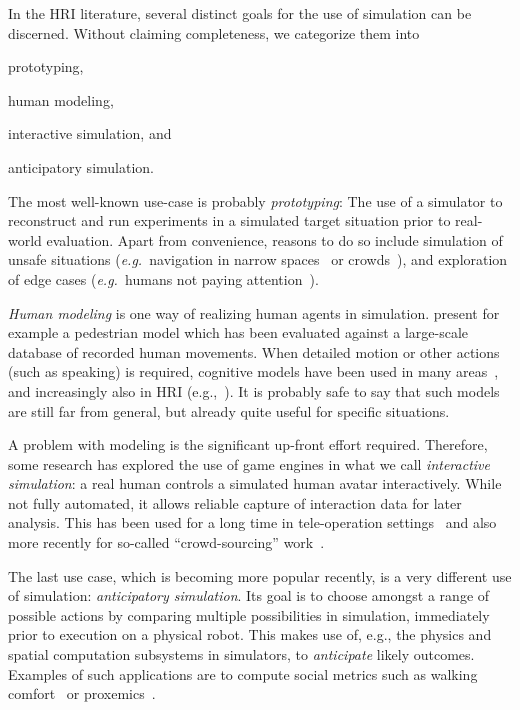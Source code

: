 \documentclass{llncs}
\newcommand{\eg}{{\textit{e.g.~}}}
\begin{document}
\begin{inparaenum}[\itshape 1\upshape)]
In the HRI literature, several distinct goals for the use of simulation can be 
discerned. Without claiming completeness, we categorize them into \item prototyping, 
\item human modeling, \item interactive simulation, and \item anticipatory simulation.  
\end{inparaenum}

The most well-known use-case is probably \emph{prototyping}: The use of a
simulator to reconstruct and run experiments in a simulated target situation
prior to real-world evaluation. Apart from convenience, reasons to do so include
simulation of unsafe situations (\eg navigation in narrow
spaces~\cite{sisbot2007human,kidokoro2013will} or
crowds~\cite{henry2010learning}), and exploration of edge cases (\eg humans not
paying attention~\cite{knepper2012pedestrian,guzzi2013human}).

\emph{Human modeling} is one way of realizing human agents in simulation.
\cite{garrell2010model} present for example a pedestrian model which has been
evaluated against a large-scale database of recorded human movements. When
detailed motion or other actions (such as speaking) is required, cognitive
models have been used in many areas~\cite{sun2006cognition}, and increasingly
also in HRI (e.g.,~\cite{trafton2013act}).  It is probably safe to say that such models are
still far from general, but already quite useful for specific situations.

A problem with modeling is the significant up-front effort required. Therefore, 
some research has explored the use of game engines in what
we call \emph{interactive simulation}: a real human controls a simulated human
avatar interactively. While not fully automated, it allows reliable capture of
interaction data for later analysis. This has been used for a long time in
tele-operation settings~\cite{wang2005validating} and also more recently for
so-called ``crowd-sourcing'' work~\cite{breazeal2013crowdsourcing}.

The last use case, which is becoming more popular recently, is a very different 
use of simulation: \emph{anticipatory simulation}. Its goal
is to choose amongst a range of possible actions by comparing multiple possibilities
in simulation, immediately prior to execution on a physical robot. This
makes use of, e.g., the physics and spatial computation subsystems in simulators,
to \emph{anticipate} likely outcomes. 
Examples of such applications are
to compute social metrics such as walking comfort~\cite{kidokoro2013will} or
proxemics~\cite{hoffman2010effects}.
\end{document}
